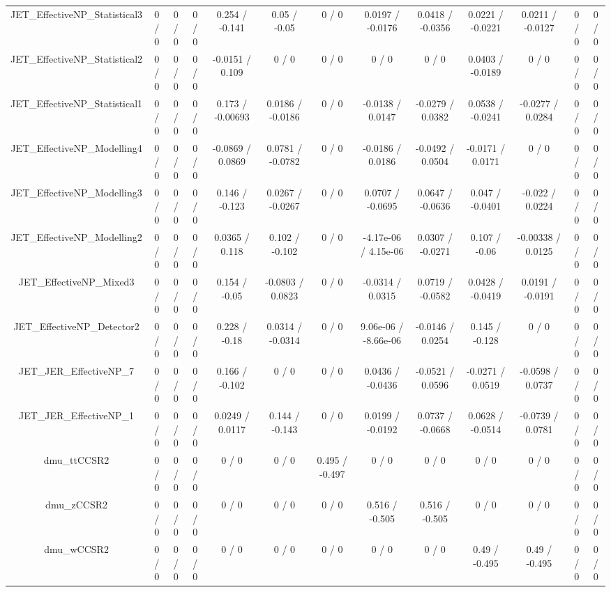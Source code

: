 \documentclass[10pt]{article}
\begin{document}
\begin{table}[htbp]
\begin{center}
\begin{tabular}{|c|c|c|c|c|c|c|c|c|c|c|c|c|}
  JET_EffectiveNP_Statistical3 & 0 / 0 & 0 / 0 & 0 / 0 & 0.254 / -0.141 & 0.05 / -0.05 & 0 / 0 & 0.0197 / -0.0176 & 0.0418 / -0.0356 & 0.0221 / -0.0221 & 0.0211 / -0.0127 & 0 / 0 & 0 / 0 \\ 
  JET_EffectiveNP_Statistical2 & 0 / 0 & 0 / 0 & 0 / 0 & -0.0151 / 0.109 & 0 / 0 & 0 / 0 & 0 / 0 & 0 / 0 & 0.0403 / -0.0189 & 0 / 0 & 0 / 0 & 0 / 0 \\ 
  JET_EffectiveNP_Statistical1 & 0 / 0 & 0 / 0 & 0 / 0 & 0.173 / -0.00693 & 0.0186 / -0.0186 & 0 / 0 & -0.0138 / 0.0147 & -0.0279 / 0.0382 & 0.0538 / -0.0241 & -0.0277 / 0.0284 & 0 / 0 & 0 / 0 \\ 
  JET_EffectiveNP_Modelling4 & 0 / 0 & 0 / 0 & 0 / 0 & -0.0869 / 0.0869 & 0.0781 / -0.0782 & 0 / 0 & -0.0186 / 0.0186 & -0.0492 / 0.0504 & -0.0171 / 0.0171 & 0 / 0 & 0 / 0 & 0 / 0 \\ 
  JET_EffectiveNP_Modelling3 & 0 / 0 & 0 / 0 & 0 / 0 & 0.146 / -0.123 & 0.0267 / -0.0267 & 0 / 0 & 0.0707 / -0.0695 & 0.0647 / -0.0636 & 0.047 / -0.0401 & -0.022 / 0.0224 & 0 / 0 & 0 / 0 \\ 
  JET_EffectiveNP_Modelling2 & 0 / 0 & 0 / 0 & 0 / 0 & 0.0365 / 0.118 & 0.102 / -0.102 & 0 / 0 & -4.17e-06 / 4.15e-06 & 0.0307 / -0.0271 & 0.107 / -0.06 & -0.00338 / 0.0125 & 0 / 0 & 0 / 0 \\ 
  JET_EffectiveNP_Mixed3 & 0 / 0 & 0 / 0 & 0 / 0 & 0.154 / -0.05 & -0.0803 / 0.0823 & 0 / 0 & -0.0314 / 0.0315 & 0.0719 / -0.0582 & 0.0428 / -0.0419 & 0.0191 / -0.0191 & 0 / 0 & 0 / 0 \\ 
  JET_EffectiveNP_Detector2 & 0 / 0 & 0 / 0 & 0 / 0 & 0.228 / -0.18 & 0.0314 / -0.0314 & 0 / 0 & 9.06e-06 / -8.66e-06 & -0.0146 / 0.0254 & 0.145 / -0.128 & 0 / 0 & 0 / 0 & 0 / 0 \\ 
  JET_JER_EffectiveNP_7 & 0 / 0 & 0 / 0 & 0 / 0 & 0.166 / -0.102 & 0 / 0 & 0 / 0 & 0.0436 / -0.0436 & -0.0521 / 0.0596 & -0.0271 / 0.0519 & -0.0598 / 0.0737 & 0 / 0 & 0 / 0 \\ 
  JET_JER_EffectiveNP_1 & 0 / 0 & 0 / 0 & 0 / 0 & 0.0249 / 0.0117 & 0.144 / -0.143 & 0 / 0 & 0.0199 / -0.0192 & 0.0737 / -0.0668 & 0.0628 / -0.0514 & -0.0739 / 0.0781 & 0 / 0 & 0 / 0 \\ 
  dmu_ttCCSR2 & 0 / 0 & 0 / 0 & 0 / 0 & 0 / 0 & 0 / 0 & 0.495 / -0.497 & 0 / 0 & 0 / 0 & 0 / 0 & 0 / 0 & 0 / 0 & 0 / 0 \\ 
  dmu_zCCSR2 & 0 / 0 & 0 / 0 & 0 / 0 & 0 / 0 & 0 / 0 & 0 / 0 & 0.516 / -0.505 & 0.516 / -0.505 & 0 / 0 & 0 / 0 & 0 / 0 & 0 / 0 \\ 
  dmu_wCCSR2 & 0 / 0 & 0 / 0 & 0 / 0 & 0 / 0 & 0 / 0 & 0 / 0 & 0 / 0 & 0 / 0 & 0.49 / -0.495 & 0.49 / -0.495 & 0 / 0 & 0 / 0 \\ 

\end{tabular}
\end{center}
\end{table}
\end{document}
